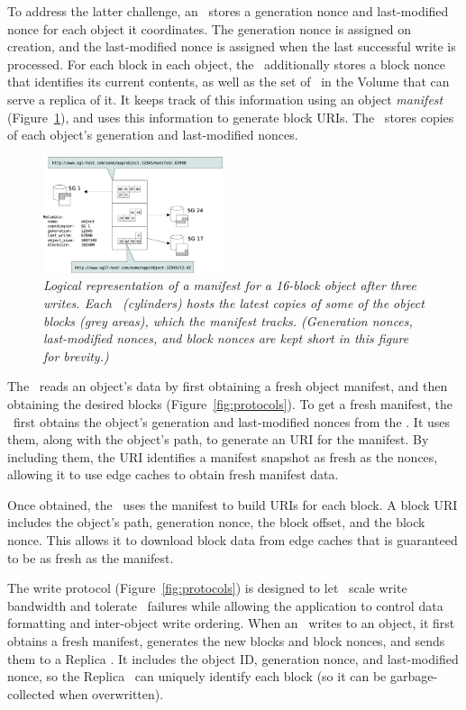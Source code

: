 To address the latter challenge, an \SG\ stores a 
generation nonce and last-modified nonce for each
object it coordinates.  The generation nonce is assigned 
on creation, and the last-modified nonce is assigned when the last successful write 
is processed.  For each block in each object, the \SG\ additionally stores a block nonce 
that identifies its current contents, as well as the set of \SGs\ in the Volume that 
can serve a replica of it.  It keeps track of this information using an object
\textit{manifest} (Figure~\ref{fig:manifest}), and uses this information
to generate block URIs.  The \MS\ stores copies of each object's generation
and last-modified nonces.

\begin{figure}[h!]
\centering
\includegraphics[width=0.47\textwidth]{figures/manifest}
\caption{\it Logical representation of a manifest for a 16-block object after 
three writes.  Each \SG\ (cylinders) hosts the latest 
copies of some of the object blocks (grey areas), which the manifest tracks.  (Generation nonces,
last-modified nonces, and block nonces are kept short in this figure for brevity.)}
\label{fig:manifest}
\end{figure}

The \SG\ reads an object's data by first obtaining a fresh object manifest, and then 
obtaining the desired blocks (Figure~\ref{fig:protocols}).
To get a fresh manifest, the \SG\ first obtains the
object's generation and last-modified 
nonces from the \MS.  It uses them, along with the object's path,
to generate an URI for the manifest.  By including them,
the URI identifies a manifest snapshot as fresh as the nonces,
allowing it to use edge caches to obtain fresh manifest data.

Once obtained, the \SG\ uses the manifest to build 
URIs for each block.  A block URI
includes the object's path, generation nonce,
the block offset, and the block nonce.  This allows 
it to download block data from edge caches that is guaranteed to be
as fresh as the manifest.

The write protocol (Figure~\ref{fig:protocols})
is designed to let \Syndicate\ scale write bandwidth and tolerate
\SG\ failures while allowing the
application to control data formatting and inter-object
write ordering.  When an \SG\ writes to an object, it first obtains
a fresh manifest, generates the new blocks
and block nonces, and sends them to a Replica \SG.  It includes the object ID,
generation nonce, and last-modified nonce, so the Replica \SG\ can uniquely
identify each block (so it can be garbage-collected when overwritten).

